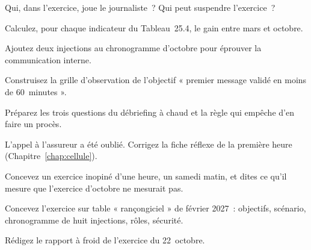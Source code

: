 \begin{boxexo}[title={\ding{45}\quad Exercice~25.2. Les rôles \niveaubase}]
Qui, dans l'exercice, joue le journaliste~? Qui peut suspendre l'exercice~?
\end{boxexo}

\begin{boxexo}[title={\ding{45}\quad Exercice~25.3. La progression \niveaubase}]
Calculez, pour chaque indicateur du Tableau~25.4, le gain entre mars et
octobre.
\end{boxexo}

\begin{boxexo}[title={\ding{45}\quad Exercice~25.4. Une injection \niveaumoyen}]
Ajoutez deux injections au chronogramme d'octobre pour éprouver la
communication interne.
\end{boxexo}

\begin{boxexo}[title={\ding{45}\quad Exercice~25.5. La grille \niveaumoyen}]
Construisez la grille d'observation de l'objectif « premier message validé
en moins de 60~minutes ».
\end{boxexo}

\begin{boxexo}[title={\ding{45}\quad Exercice~25.6. À chaud \niveaumoyen}]
Préparez les trois questions du débriefing à chaud et la règle qui
empêche d'en faire un procès.
\end{boxexo}

\begin{boxexo}[title={\ding{45}\quad Exercice~25.7. L'assureur \niveaumoyen}]
L'appel à l'assureur a été oublié. Corrigez la fiche réflexe de la
première heure (Chapitre~\ref{chap:cellule}).
\end{boxexo}

\begin{boxexo}[title={\ding{45}\quad Exercice~25.8. Inopiné \niveaumoyen}]
Concevez un exercice inopiné d'une heure, un samedi matin, et dites ce
qu'il mesure que l'exercice d'octobre ne mesurait pas.
\end{boxexo}

\begin{boxexo}[title={\ding{45}\quad Exercice~25.9. L'exercice de février \niveauexpert}]
Concevez l'exercice sur table « rançongiciel » de février 2027~: objectifs,
scénario, chronogramme de huit injections, rôles, sécurité.
\end{boxexo}

\begin{boxexo}[title={\ding{45}\quad Exercice~25.10. Le rapport à froid \niveauexpert}]
Rédigez le rapport à froid de l'exercice du 22~octobre.
\end{boxexo}

